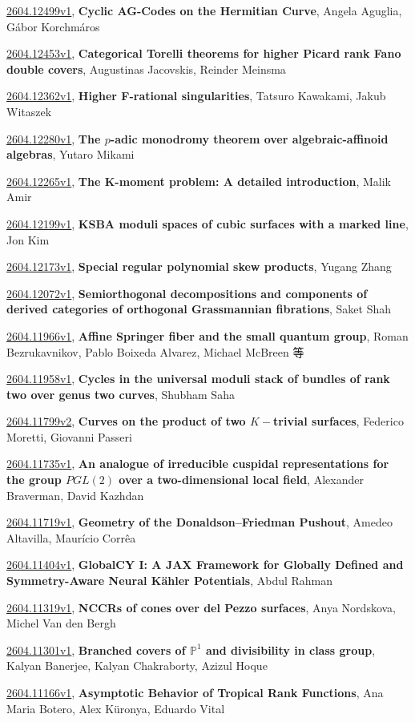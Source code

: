 \documentclass[9pt, a4paper]{article}
\theoremstyle{plain}
\theoremstyle{definition}
\theoremstyle{remark}
\newcommand{\arxiv}[3]{\href{https://arxiv.org/abs/#1}{#1}, \textbf{\textcolor{arxivblue}{#2}}, #3}
\begin{document}
\arxiv{2604.12499v1}{Cyclic AG-Codes on the Hermitian Curve}{Angela Aguglia, Gábor Korchmáros}

\arxiv{2604.12453v1}{Categorical Torelli theorems for higher Picard rank Fano double covers}{Augustinas Jacovskis, Reinder Meinsma}

\arxiv{2604.12362v1}{Higher F-rational singularities}{Tatsuro Kawakami, Jakub Witaszek}

\arxiv{2604.12280v1}{The $p$-adic monodromy theorem over algebraic-affinoid algebras}{Yutaro Mikami}

\arxiv{2604.12265v1}{The K-moment problem: A detailed introduction}{Malik Amir}

\arxiv{2604.12199v1}{KSBA moduli spaces of cubic surfaces with a marked line}{Jon Kim}

\arxiv{2604.12173v1}{Special regular polynomial skew products}{Yugang Zhang}

\arxiv{2604.12072v1}{Semiorthogonal decompositions and components of derived categories of orthogonal Grassmannian fibrations}{Saket Shah}

\arxiv{2604.11966v1}{Affine Springer fiber and the small quantum group}{Roman Bezrukavnikov, Pablo Boixeda Alvarez, Michael McBreen 等}

\arxiv{2604.11958v1}{Cycles in the universal moduli stack of bundles of rank two over genus two curves}{Shubham Saha}

\arxiv{2604.11799v2}{Curves on the product of two $K-$trivial surfaces}{Federico Moretti, Giovanni Passeri}

\arxiv{2604.11735v1}{An analogue of irreducible cuspidal representations for the group $PGL(2)$ over a two-dimensional local field}{Alexander Braverman, David Kazhdan}

\arxiv{2604.11719v1}{Geometry of the Donaldson--Friedman Pushout}{Amedeo Altavilla, Maurício Corrêa}

\arxiv{2604.11404v1}{GlobalCY I: A JAX Framework for Globally Defined and Symmetry-Aware Neural Kähler Potentials}{Abdul Rahman}

\arxiv{2604.11319v1}{NCCRs of cones over del Pezzo surfaces}{Anya Nordskova, Michel Van den Bergh}

\arxiv{2604.11301v1}{Branched covers of $\mathbb{P}^1$ and divisibility in class group}{Kalyan Banerjee, Kalyan Chakraborty, Azizul Hoque}

\arxiv{2604.11166v1}{Asymptotic Behavior of Tropical Rank Functions}{Ana Maria Botero, Alex Küronya, Eduardo Vital}
\end{document}
